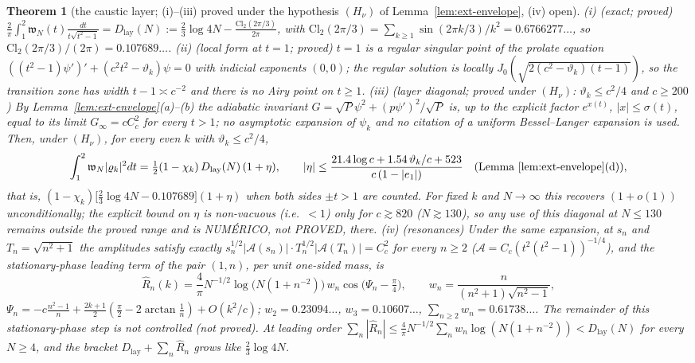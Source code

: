 \documentclass[11pt]{amsart}
\newtheorem{theorem}{Theorem}[section]
\theoremstyle{definition}
\theoremstyle{remark}
\begin{document}
\begin{theorem}[the caustic layer; (i)--(iii) proved under the hypothesis $(H_\nu)$ of Lemma~\ref{lem:ext-envelope}, (iv) open]\label{thm:ext-layer}
\emph{(i) (exact; proved)} $\frac2\pi\int_1^2\mathfrak w_N(t)\frac{dt}{t\sqrt{t^2-1}}=D_{\mathrm{lay}}(N):=\frac23\log4N-\frac{\mathrm{Cl}_2(2\pi/3)}{2\pi}$,
with $\mathrm{Cl}_2(2\pi/3)=\sum_{k\ge1}\sin(2\pi k/3)/k^2=0.6766277\ldots$, so $\mathrm{Cl}_2(2\pi/3)/(2\pi)=0.107689\ldots$.
\emph{(ii) (local form at $t=1$; proved)} $t=1$ is a regular singular point of the prolate equation
$((t^2-1)\psi')'+(c^2t^2-\vartheta_k)\psi=0$ with indicial exponents $(0,0)$; the regular solution is locally
$J_0(\sqrt{2(c^2-\vartheta_k)(t-1)})$, so the transition zone has width $t-1\asymp c^{-2}$ and there is no Airy point on $t\ge1$.
\emph{(iii) (layer diagonal; proved under $(H_\nu)$: $\vartheta_k\le c^2/4$ and $c\ge200$)} By
Lemma~\ref{lem:ext-envelope}(a)--(b) the adiabatic invariant $G=\sqrt P\psi^2+(p\psi')^2/\sqrt P$ is, up to the explicit factor
$e^{x(t)}$, $|x|\le\sigma(t)$, equal to its limit $G_\infty=cC_c^2$ for every $t>1$; no asymptotic expansion of $\psi_k$ and no
citation of a uniform Bessel--Langer expansion is used. Then, under $(H_\nu)$, for every even $k$ with $\vartheta_k\le c^2/4$,
\[
\int_1^2\mathfrak w_N|\varrho_k|^2dt=\tfrac12(1-\chi_k)\,D_{\mathrm{lay}}(N)\,(1+\eta),\qquad
|\eta|\le\frac{21.4\log c+1.54\,\vartheta_k/c+523}{c\,(1-|e_1|)}\quad(\text{Lemma~\ref{lem:ext-envelope}(d)}),
\]
that is, $(1-\chi_k)\big[\frac23\log4N-0.107689\big](1+\eta)$ when both sides $\pm t>1$ are counted. For fixed $k$ and
$N\to\infty$ this recovers $(1+o(1))$ unconditionally; the explicit bound on $\eta$ is non-vacuous (i.e.\ $<1$) only for
$c\gtrsim820$ ($N\gtrsim130$), so any use of this diagonal at $N\le130$ remains outside the proved range and is
NUM\'ERICO, not PROVED, there.
\emph{(iv) (resonances)} Under the same expansion, at $s_n$ and $T_n=\sqrt{n^2+1}$ the amplitudes satisfy exactly
$s_n^{1/2}|\mathcal A(s_n)|\cdot T_n^{1/2}|\mathcal A(T_n)|=C_c^2$ for every $n\ge2$ ($\mathcal A=C_c(t^2(t^2-1))^{-1/4}$), and the
stationary-phase leading term of the pair $(1,n)$, per unit one-sided mass, is
\[
\widehat R_n(k)=\frac4\pi N^{-1/2}\log\big(N(1+n^{-2})\big)\,w_n\cos\big(\Psi_n-\tfrac\pi4\big),\qquad w_n=\frac n{(n^2+1)\sqrt{n^2-1}},
\]
$\Psi_n=-c\frac{n^2-1}n+\frac{2k+1}2(\frac\pi2-2\arctan\frac1n)+O(k^2/c)$; $w_2=0.23094\ldots$, $w_3=0.10607\ldots$,
$\sum_{n\ge2}w_n=0.61738\ldots$. The remainder of this stationary-phase step is not controlled (not proved). At leading order
$\sum_n|\widehat R_n|\le\frac4\pi N^{-1/2}\sum_nw_n\log(N(1+n^{-2}))<D_{\mathrm{lay}}(N)$ for every $N\ge4$, and the bracket
$D_{\mathrm{lay}}+\sum_n\widehat R_n$ grows like $\frac23\log4N$.
\end{theorem}
\end{document}
